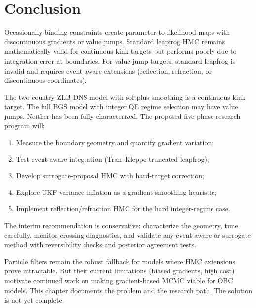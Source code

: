 \section{Conclusion}

Occasionally-binding constraints create parameter-to-likelihood maps with
discontinuous gradients or value jumps. Standard leapfrog HMC remains
mathematically valid for continuous-kink targets but performs poorly due to
integration error at boundaries. For value-jump targets, standard leapfrog is
invalid and requires event-aware extensions (reflection, refraction, or
discontinuous coordinates).

The two-country ZLB DNS model with softplus smoothing is a continuous-kink
target. The full BGS model with integer QE regime selection may have value
jumps. Neither has been fully characterized. The proposed five-phase research
program will:
\begin{enumerate}
  \item Measure the boundary geometry and quantify gradient variation;
  \item Test event-aware integration (Tran--Kleppe truncated leapfrog);
  \item Develop surrogate-proposal HMC with hard-target correction;
  \item Explore UKF variance inflation as a gradient-smoothing heuristic;
  \item Implement reflection/refraction HMC for the hard integer-regime case.
\end{enumerate}

The interim recommendation is conservative: characterize the geometry, tune
carefully, monitor crossing diagnostics, and validate any event-aware or
surrogate method with reversibility checks and posterior agreement tests.

Particle filters remain the robust fallback for models where HMC extensions
prove intractable. But their current limitations (biased gradients, high cost)
motivate continued work on making gradient-based MCMC viable for OBC models.
This chapter documents the problem and the research path. The solution is not
yet complete.
